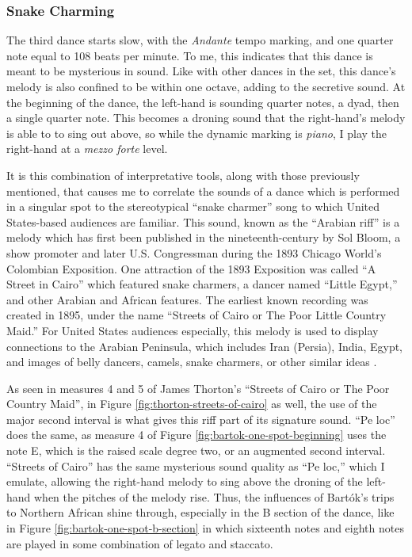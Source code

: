 \subsubsection{Snake Charming}

The third dance starts slow, with the \textit{Andante} tempo marking, and one quarter note equal to 108 beats per minute. To me, this indicates that this dance is meant to be mysterious in sound. Like with other dances in the set, this dance's melody is also confined to be within one octave, adding to the secretive sound. At the beginning of the dance, the left-hand is sounding quarter notes, a dyad, then a single quarter note. This becomes a droning sound that the right-hand's melody is able to to sing out above, so while the dynamic marking is \textit{piano}, I play the right-hand at a \textit{mezzo forte} level. 

It is this combination of interpretative tools, along with those previously mentioned, that causes me to correlate the sounds of a dance which is performed in a singular spot to the stereotypical ``snake charmer'' song to which United States-based audiences are familiar. This sound, known as the ``Arabian riff'' is a melody which has first been published in the nineteenth-century by Sol Bloom, a show promoter and later U.S. Congressman during the 1893 Chicago World's Colombian Exposition\autocite{Shira}. One attraction of the 1893 Exposition was called ``A Street in Cairo'' which featured snake charmers, a dancer named ``Little Egypt,'' and other Arabian and African features. The earliest known recording was created in 1895, under the name ``Streets of Cairo or The Poor Little Country Maid.'' For United States audiences especially, this melody is used to display connections to the Arabian Peninsula, which includes Iran (Persia), India, Egypt, and images of belly dancers, camels, snake charmers, or other similar ideas \autocite{Shira}.

As seen in measures 4 and 5 of James Thorton's ``Streets of Cairo or The Poor Country Maid'', in Figure \ref{fig:thorton-streets-of-cairo}\autocite{Thorton_1895} as well, the use of the major second interval is what gives this riff part of its signature sound. ``Pe loc'' does the same, as measure 4 of Figure \ref{fig:bartok-one-spot-beginning}\autocite{Lung_2016} uses the note E\musSharp{}, which is the raised scale degree two, or an augmented second interval. ``Streets of Cairo'' has the same mysterious sound quality as ``Pe loc,'' which I emulate, allowing the right-hand melody to sing above the droning of the left-hand when the pitches of the melody rise. Thus, the influences of Bartók's trips to Northern African shine through, especially in the B section of the dance, like in Figure \ref{fig:bartok-one-spot-b-section}\autocite{Lung_2016} in which sixteenth notes and eighth notes are played in some combination of legato and staccato.

